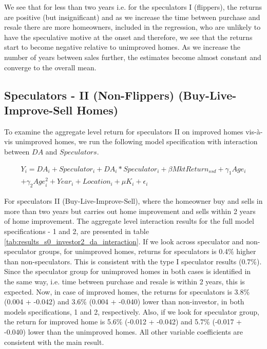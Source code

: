 \documentclass[AEJ,reqno, draftmode]{AEA} %
\begin{document}
We see that for less than two years i.e. for the speculators I (flippers), the returns are positive (but insignificant) and as we increase the time between purchase and resale there are more homeowners, included in the regression, who are unlikely to have the speculative motive at the onset and therefore, we see that the returns start to become negative relative to unimproved homes. As we increase the number of years between sales further, the estimates become almost constant and converge to the overall mean. 


\subsection{Speculators - II (Non-Flippers) (Buy-Live-Improve-Sell Homes)}

To examine the aggregate level return for speculators II on improved homes vis-à-vis unimproved homes, we run the following model specification with interaction between $DA$ and $Speculators$. 

\begin{equation} \label{eq: spec II}
\begin{aligned}
    Y_i = DA_i + Speculator_i + DA_i * Speculator_i + \beta{MktReturn_{ssd}} + \gamma_1{Age_i}\\ + \gamma_2{Age_i^2} + Year_i + Location_i + \mu{K_i} + \epsilon_i
\end{aligned}
\end{equation}

For speculators II (Buy-Live-Improve-Sell), where the homeowner buy and sells in more than two years but carries out home improvement and sells within 2 years of home improvement. The aggregate level interaction results for the full model specifications - 1 and 2, are presented in table \ref{tab:results_s0_investor2_da_interaction}. 
If we look across speculator and non-speculator groups, for unimproved homes, returns for speculators is 0.4\% higher than non-speculators. This is consistent with the type I speculator results (0.7\%). Since the speculator group for unimproved homes in both cases is identified in the same way, i.e. time between purchase and resale is within 2 years, this is expected. Now, in case of improved homes, the returns for speculators is 3.8\% (0.004 + -0.042) and 3.6\% (0.004 + -0.040) lower than non-investor, in both models specifications, 1 and 2, respectively. Also, if we look for speculator group, the return for improved home is 5.6\% (-0.012 + -0.042) and 5.7\% (-0.017 + -0.040) lower than the unimproved homes. All other variable coefficients are consistent with the main result. 
\end{document}
